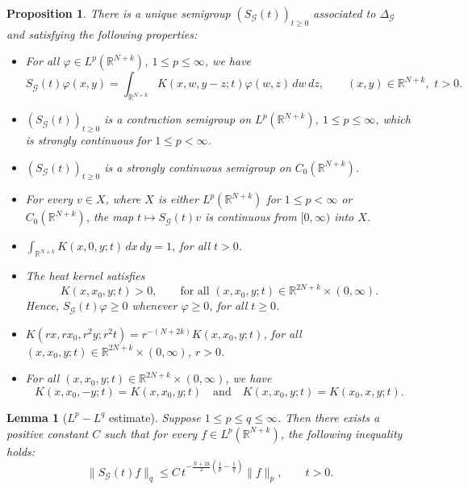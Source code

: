 \documentclass[a4,psfig,english,12pt,epsf,portrait]{article}
\newtheorem{proposition}[theorem]{Proposition}
\newtheorem{lemma}[theorem]{Lemma}
\numberwithin{equation}{section}
\def\R{{\mathbb {R}}}
\def\R{\mathbb{R}}
\begin{document}
\begin{proposition}\label{properties}
	There is a unique semigroup $(S_{\mathcal{G}}(t))_{t\geq0}$ associated to $\Delta_{\mathcal{G}}$ and satisfying the following properties:
	\begin{itemize}
		\item[$(i)$]  For all $\varphi\in L^p(\R^{N+k})$, $1\leq p\leq \infty$, we have
		$$S_{\mathcal{G}}(t)\varphi(x,y)=\int_{\R^{N+k}} K(x,w,y-z;t) \varphi(w,z)\,dw\,dz,\qquad (x,y)\in \R^{N+k},\,\,t>0.$$
		\item[$(ii)$] $(S_\mathcal{G}(t))_{t\geq0}$ is a contraction semigroup on $L^p(\mathbb{R}^{N+k})$, $1\leq p\leq \infty$, which is strongly continuous for $1\leq p<\infty$. 
		\item[$(iii)$] $(S_\mathcal{G}(t))_{t\geq0}$  is a strongly continuous semigroup on $C_0(\mathbb{R}^{N+k})$.
		\item[$(iv)$] For every $v\in X$, where $X$ is either $L^p(\mathbb{R}^{N+k})$ for $1\leq p< \infty$ or $C_0(\mathbb{R}^{N+k})$, the map $t\longmapsto S_\mathcal{G}(t)v$ is continuous from $[0,\infty)$ into $X$.
		\item[$(v)$] $\displaystyle\int_{\mathbb{R}^{N+k}}K(x,0,y;t)  \,dx\,dy=1$, for all $t>0$.
		\item[$(vi)$] The heat kernel satisfies
		$$K(x,x_0,y;t)>0,\qquad \textrm{for all}\,\, (x, x_0,y;t)\in\R^{2N+k}\times(0,\infty).$$
		Hence, $S_\mathcal{G}(t)\varphi\geq 0$ whenever $\varphi\geq0$, for all $t\geq0$.
		\item[$(vii)$] $K(rx,rx_0,r^2y;r^2t)=r^{-(N+2k)}K(x,x_0,y;t)$, for all $(x, x_0,y;t)\in\R^{2N+k}\times(0,\infty)$, $r>0$.
		\item[$(viii)$]  For all $(x, x_0,y;t)\in\R^{2N+k}\times(0,\infty)$, we have
		$$K(x,x_0,-y;t)=K(x,x_0,y;t)\quad\mathrm{and}\quad K(x,x_0,y;t)=K(x_0,x,y;t).$$
	\end{itemize}
\end{proposition} 


\begin{lemma}[$L^p-L^q$ estimate]\label{Lp-Lqestimate} 
	Suppose $1\leq p\leq q\leq \infty$. Then there exists a positive constant $C$ such that for every $f\in L^p(\mathbb{R}^{N+k})$, the following inequality holds:
	\begin{equation}\label{semigroup}
		\|S_{\mathcal{G}}(t)f\|_q\leq C\,t^{-\frac{N+2k}{2}(\frac{1}{p}-\frac{1}{q})}\|f\|_p,\qquad t>0.
	\end{equation}
\end{lemma}
\end{document}
